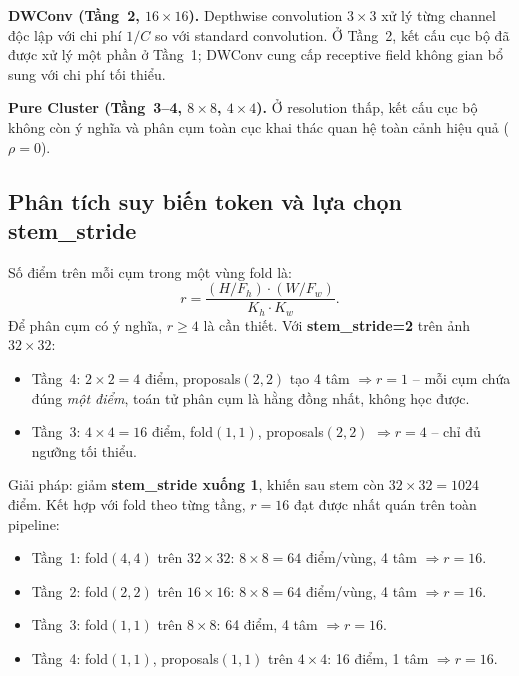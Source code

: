 \documentclass[journal]{IEEEtran}
\begin{document}
\noindent\textbf{DWConv (Tầng~2, $16\!\times\!16$).}
Depthwise convolution $3\!\times\!3$ xử lý từng channel độc lập với
chi phí $1/C$ so với standard convolution. Ở Tầng~2, kết cấu cục bộ
đã được xử lý một phần ở Tầng~1; DWConv cung cấp receptive field
không gian bổ sung với chi phí tối thiểu.

\noindent\textbf{Pure Cluster (Tầng~3--4, $8\!\times\!8$,
$4\!\times\!4$).}
Ở resolution thấp, kết cấu cục bộ không còn ý nghĩa và phân cụm
toàn cục khai thác quan hệ toàn cảnh hiệu quả ($\rho{=}0$).

\subsection{Phân tích suy biến token và lựa chọn stem\_stride}
\label{sec:degeneracy}

Số điểm trên mỗi cụm trong một vùng fold là:
\begin{equation}
  r = \frac{(H/F_h)\cdot(W/F_w)}{K_h\cdot K_w}.
  \label{eq:ratio}
\end{equation}
Để phân cụm có ý nghĩa, $r\geq4$ là cần thiết. Với
\textbf{stem\_stride=2} trên ảnh $32\!\times\!32$:
\begin{itemize}
  \item Tầng~4: $2\!\times\!2=4$ điểm, proposals$(2,2)$ tạo 4 tâm
        $\Rightarrow r=1$ -- mỗi cụm chứa đúng \emph{một điểm}, toán
        tử phân cụm là hằng đồng nhất, không học được.
  \item Tầng~3: $4\!\times\!4=16$ điểm, fold$(1,1)$,
        proposals$(2,2)$ $\Rightarrow r=4$ -- chỉ đủ ngưỡng tối thiểu.
\end{itemize}

Giải pháp: giảm \textbf{stem\_stride xuống 1}, khiến sau stem còn
$32\!\times\!32=1024$ điểm. Kết hợp với fold theo từng tầng, $r=16$
đạt được nhất quán trên toàn pipeline:
\begin{itemize}
  \item Tầng~1: fold$(4,4)$ trên $32\!\times\!32$:
        $8\!\times\!8=64$ điểm/vùng, 4 tâm $\Rightarrow r=16$. \checkmark
  \item Tầng~2: fold$(2,2)$ trên $16\!\times\!16$:
        $8\!\times\!8=64$ điểm/vùng, 4 tâm $\Rightarrow r=16$. \checkmark
  \item Tầng~3: fold$(1,1)$ trên $8\!\times\!8$:
        64 điểm, 4 tâm $\Rightarrow r=16$. \checkmark
  \item Tầng~4: fold$(1,1)$, proposals$(1,1)$ trên $4\!\times\!4$:
        16 điểm, 1 tâm $\Rightarrow r=16$. \checkmark
\end{itemize}
\end{document}
